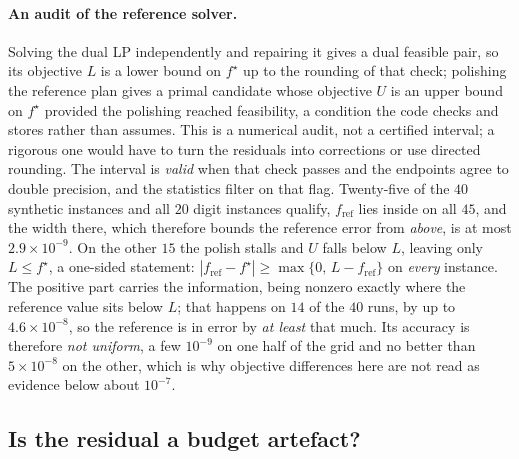 \documentclass{article}
\newcommand{\Tol}[1]{10^{-#1}}
\begin{document}
\paragraph{An audit of the reference solver.}
Solving the dual LP independently and repairing it gives a dual feasible pair, so its
objective $L$ is a lower bound on $f^\star$ up to the rounding of that check; polishing the
reference plan gives a primal candidate whose objective $U$ is an upper bound on $f^\star$
provided the polishing reached feasibility, a condition the code checks and stores rather
than assumes. This is a numerical audit, not a certified interval; a rigorous one would have
to turn the residuals into corrections or use directed rounding. The interval is \emph{valid}
when that check passes and the endpoints agree to double precision, and the statistics filter
on that flag. Twenty-five of the $40$ synthetic instances and all $20$ digit instances
qualify, $f_{\mathrm{ref}}$ lies inside on all $45$, and the width there, which therefore
bounds the reference error from \emph{above}, is at most $2.9\times\Tol{9}$. On the other
$15$ the polish stalls and $U$ falls below $L$, leaving only $L\le f^\star$, a one-sided
statement: $|f_{\mathrm{ref}}-f^\star|\ge\max\{0,\,L-f_{\mathrm{ref}}\}$ on \emph{every}
instance. The positive part carries the information, being nonzero exactly where the
reference value sits below $L$; that happens on $14$ of the $40$ runs, by up to
$4.6\times\Tol{8}$, so the reference is in error by \emph{at least} that much. Its accuracy
is therefore \emph{not uniform}, a few $\Tol{9}$ on one half of the grid and no better than
$5\times\Tol{8}$ on the other, which is why objective differences here are not read as
evidence below about $\Tol{7}$.

\begin{table}[t]
\centering
\caption{Certified optimality bound against the reference-based objective error, medians
over the $10$ instances of each size. The bound uses no reference value; both panels
are on the same scale.}
\label{tab:certificate}
\footnotesize

\end{table}

\subsection{Is the residual a budget artefact?}
\label{sec:budget}
\end{document}
